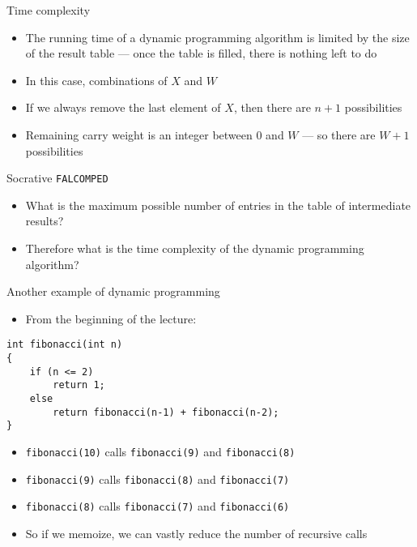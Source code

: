 \begin{frame}{Time complexity}
	\begin{itemize}
		\pause\item The running time of a dynamic programming algorithm is limited by the size of the result table --- once the table is filled, there is nothing left to do
		\pause\item In this case, combinations of $X$ and $W$
		\pause\item If we always remove the last element of $X$, then there are $n+1$ possibilities
		\pause\item Remaining carry weight is an integer between 0 and $W$ --- so there are $W+1$ possibilities
	\end{itemize}
	\pause\begin{center}Socrative \texttt{FALCOMPED}\end{center}
	\begin{itemize}
		\item What is the maximum possible number of entries in the table of intermediate results?
		\pause\item Therefore what is the time complexity of the dynamic programming algorithm?
	\end{itemize}
\end{frame}

\begin{frame}[fragile]{Another example of dynamic programming}
    \begin{itemize}
        \pause\item From the beginning of the lecture:
    \end{itemize}
    \begin{lstlisting}
int fibonacci(int n)
{
    if (n <= 2)
        return 1;
    else
        return fibonacci(n-1) + fibonacci(n-2);
}
    \end{lstlisting}
    \begin{itemize}
        \pause\item \lstinline{fibonacci(10)} calls \lstinline{fibonacci(9)} and \lstinline{fibonacci(8)}
        \pause\item \lstinline{fibonacci(9)} calls \lstinline{fibonacci(8)} and \lstinline{fibonacci(7)}
        \pause\item \lstinline{fibonacci(8)} calls \lstinline{fibonacci(7)} and \lstinline{fibonacci(6)}
        \pause\item So if we memoize, we can vastly reduce the number of recursive calls
    \end{itemize}
\end{frame}

